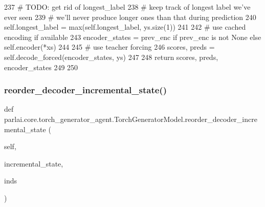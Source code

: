 \begin{DoxyCode}
237         \textcolor{comment}{# TODO: get rid of longest\_label}
238         \textcolor{comment}{# keep track of longest label we've ever seen}
239         \textcolor{comment}{# we'll never produce longer ones than that during prediction}
240         self.longest\_label = max(self.longest\_label, ys.size(1))
241 
242         \textcolor{comment}{# use cached encoding if available}
243         encoder\_states = prev\_enc \textcolor{keywordflow}{if} prev\_enc \textcolor{keywordflow}{is} \textcolor{keywordflow}{not} \textcolor{keywordtype}{None} \textcolor{keywordflow}{else} self.encoder(*xs)
244 
245         \textcolor{comment}{# use teacher forcing}
246         scores, preds = self.decode\_forced(encoder\_states, ys)
247 
248         \textcolor{keywordflow}{return} scores, preds, encoder\_states
249 
250 
\end{DoxyCode}
\mbox{\label{classparlai_1_1core_1_1torch__generator__agent_1_1TorchGeneratorModel_a828d2881fb73ead7d27691c73d1f6f36}} 
\subsubsection{\texorpdfstring{reorder\+\_\+decoder\+\_\+incremental\+\_\+state()}{reorder\_decoder\_incremental\_state()}}
{\footnotesize\ttfamily def parlai.\+core.\+torch\+\_\+generator\+\_\+agent.\+Torch\+Generator\+Model.\+reorder\+\_\+decoder\+\_\+incremental\+\_\+state (\begin{DoxyParamCaption}\item[{}]{self,  }\item[{}]{incremental\+\_\+state,  }\item[{}]{inds }\end{DoxyParamCaption})}

